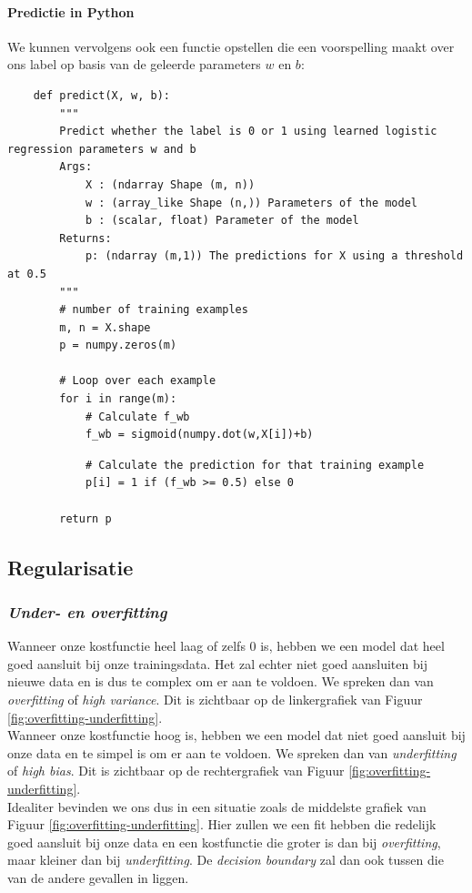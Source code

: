 \paragraph{Predictie in Python}

We kunnen vervolgens ook een functie opstellen die een voorspelling maakt over ons label op basis van de geleerde parameters $w$ en $b$:

\begin{lstlisting}
	def predict(X, w, b): 
	    """
	    Predict whether the label is 0 or 1 using learned logistic regression parameters w and b
	    Args:
	        X : (ndarray Shape (m, n))
	        w : (array_like Shape (n,)) Parameters of the model
	        b : (scalar, float) Parameter of the model
	    Returns:
	        p: (ndarray (m,1)) The predictions for X using a threshold at 0.5
	    """
	    # number of training examples
	    m, n = X.shape   
	    p = numpy.zeros(m)
	
	    # Loop over each example
	    for i in range(m):   
	        # Calculate f_wb 
	        f_wb = sigmoid(numpy.dot(w,X[i])+b)
\end{lstlisting}
\newpage
\begin{lstlisting}		
	        # Calculate the prediction for that training example 
	        p[i] = 1 if (f_wb >= 0.5) else 0
	
	    return p
\end{lstlisting}

\subsection{Regularisatie}
\subsubsection{\textit{Under- en overfitting}}
Wanneer onze kostfunctie heel laag of zelfs 0 is, hebben we een model dat heel goed aansluit bij onze trainingsdata. Het zal echter niet goed aansluiten bij nieuwe data en is dus te complex om er aan te voldoen. We spreken dan van \textit{overfitting} of \textit{high variance}. Dit is zichtbaar op de linkergrafiek van Figuur \ref{fig:overfitting-underfitting}. \\
\newline
Wanneer onze kostfunctie hoog is, hebben we een model dat niet goed aansluit bij onze data en te simpel is om er aan te voldoen. We spreken dan van \textit{underfitting} of \textit{high bias}. Dit is zichtbaar op de rechtergrafiek van Figuur \ref{fig:overfitting-underfitting}. \\
\newline
Idealiter bevinden we ons dus in een situatie zoals de middelste grafiek van Figuur \ref{fig:overfitting-underfitting}. Hier zullen we een fit hebben die redelijk goed aansluit bij onze data en een kostfunctie die groter is dan bij \textit{overfitting}, maar kleiner dan bij \textit{underfitting}. De \textit{decision boundary} zal dan ook tussen die van de andere gevallen in liggen.

